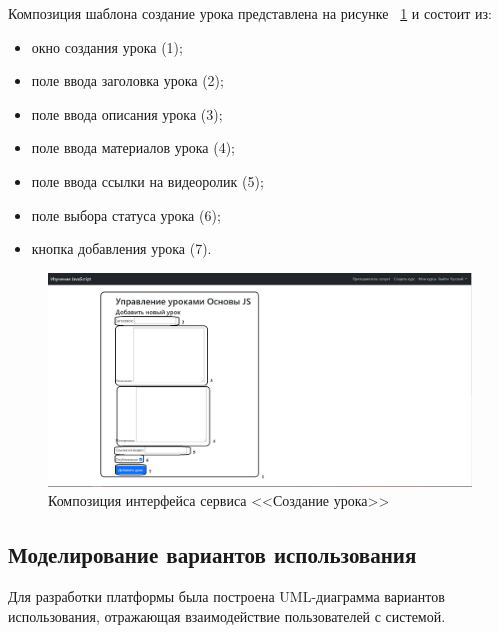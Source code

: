 \newpage
Композиция шаблона создание урока представлена на рисунке ~\ref{templ:image10} и состоит из:

\begin{itemize}
	\item окно создания урока (1);
	\item поле ввода заголовка урока (2);
	\item поле ввода описания урока (3);
	\item поле ввода материалов урока (4);
	\item поле ввода ссылки на видеоролик (5);
	\item поле выбора статуса урока (6);
	\item кнопка добавления урока (7).
\end{itemize}

\begin{figure}[h]
	\centering
	\includegraphics[width=0.9\linewidth]{images/создатьурок}
	\caption{Композиция интерфейса сервиса <<Создание урока>>}
	\label{templ:image10}
\end{figure}

\clearpage
\subsection{Моделирование вариантов использования}

Для разработки платформы была построена UML-диаграмма вариантов использования, отражающая взаимодействие пользователей с системой.

